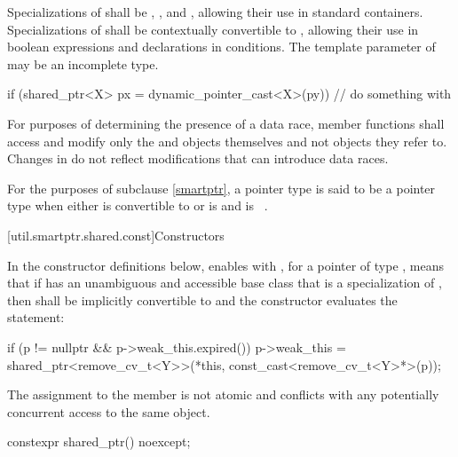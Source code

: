 \pnum
Specializations of  shall be ,
, and , allowing their use in standard
containers. Specializations of  shall be
contextually convertible to ,
allowing their use in boolean expressions and declarations in conditions. The template
parameter  of  may be an incomplete type.

\pnum
\begin{example}
\begin{codeblock}
if (shared_ptr<X> px = dynamic_pointer_cast<X>(py)) {
  // do something with 
}
\end{codeblock}
\end{example}

\pnum
For purposes of determining the presence of a data race, member functions shall
access and modify only the  and  objects
themselves and not objects they refer to. Changes in  do not
reflect modifications that can introduce data races.

\pnum
For the purposes of subclause \ref{smartptr},
a pointer type  is said to be
a pointer type  when either
 is convertible to  or
 is  and  is \cv{}~.

[util.smartptr.shared.const]{Constructors}

\pnum
In the constructor definitions below,
enables  with ,
for a pointer  of type ,
means that if  has an unambiguous and accessible base class
that is a specialization of ,
then  shall be implicitly convertible to  and
the constructor evaluates the statement:
\begin{codeblock}
if (p != nullptr && p->weak_this.expired())
  p->weak_this = shared_ptr<remove_cv_t<Y>>(*this, const_cast<remove_cv_t<Y>*>(p));
\end{codeblock}
The assignment to the  member is not atomic and
conflicts with any potentially concurrent access to the same object.

%
\begin{itemdecl}
constexpr shared_ptr() noexcept;
\end{itemdecl}

